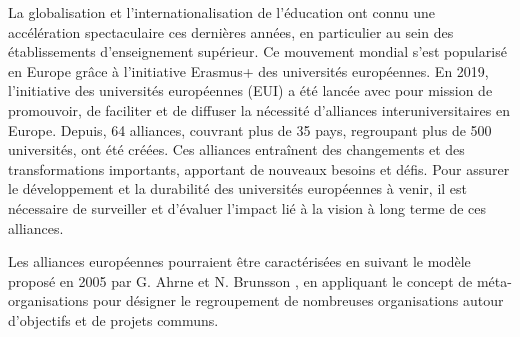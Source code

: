 La globalisation et l'internationalisation de l'éducation ont connu une accélération spectaculaire ces dernières années, en particulier au sein des établissements d'enseignement supérieur. Ce mouvement mondial s'est popularisé en Europe grâce à l'initiative Erasmus+ des universités européennes. En 2019, l'initiative des universités européennes (EUI) a été lancée avec pour mission de promouvoir, de faciliter et de diffuser la nécessité d'alliances interuniversitaires en Europe. Depuis, 64 alliances, couvrant plus de 35 pays, regroupant plus de 500 universités, ont été créées. Ces alliances entraînent des changements et des transformations importants, apportant de nouveaux besoins et défis. Pour assurer le développement et la durabilité des universités européennes à venir, il est nécessaire de surveiller et d'évaluer l'impact lié à la vision à long terme de ces alliances.

Les alliances européennes pourraient être caractérisées en suivant le modèle proposé en 2005 par G. Ahrne et N. Brunsson \cite{ahrne_organizations_2005}, en appliquant le concept de méta-organisations pour désigner le regroupement de nombreuses organisations autour d'objectifs et de projets communs. 